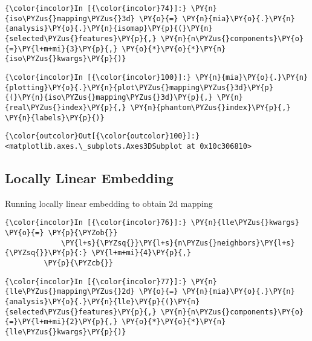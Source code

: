     \begin{Verbatim}[commandchars=\\\{\}]
{\color{incolor}In [{\color{incolor}74}]:} \PY{n}{iso\PYZus{}mapping\PYZus{}3d} \PY{o}{=} \PY{n}{mia}\PY{o}{.}\PY{n}{analysis}\PY{o}{.}\PY{n}{isomap}\PY{p}{(}\PY{n}{selected\PYZus{}features}\PY{p}{,} \PY{n}{n\PYZus{}components}\PY{o}{=}\PY{l+m+mi}{3}\PY{p}{,} \PY{o}{*}\PY{o}{*}\PY{n}{iso\PYZus{}kwargs}\PY{p}{)}
\end{Verbatim}

    \begin{Verbatim}[commandchars=\\\{\}]
{\color{incolor}In [{\color{incolor}100}]:} \PY{n}{mia}\PY{o}{.}\PY{n}{plotting}\PY{o}{.}\PY{n}{plot\PYZus{}mapping\PYZus{}3d}\PY{p}{(}\PY{n}{iso\PYZus{}mapping\PYZus{}3d}\PY{p}{,} \PY{n}{real\PYZus{}index}\PY{p}{,} \PY{n}{phantom\PYZus{}index}\PY{p}{,} \PY{n}{labels}\PY{p}{)}
\end{Verbatim}

            \begin{Verbatim}[commandchars=\\\{\}]
{\color{outcolor}Out[{\color{outcolor}100}]:} <matplotlib.axes.\_subplots.Axes3DSubplot at 0x10c306810>
\end{Verbatim}

    \subsection{Locally Linear Embedding}\label{locally-linear-embedding}

Running locally linear embedding to obtain 2d mapping

    \begin{Verbatim}[commandchars=\\\{\}]
{\color{incolor}In [{\color{incolor}76}]:} \PY{n}{lle\PYZus{}kwargs} \PY{o}{=} \PY{p}{\PYZob{}}
             \PY{l+s}{\PYZsq{}}\PY{l+s}{n\PYZus{}neighbors}\PY{l+s}{\PYZsq{}}\PY{p}{:} \PY{l+m+mi}{4}\PY{p}{,}
         \PY{p}{\PYZcb{}}
\end{Verbatim}

    \begin{Verbatim}[commandchars=\\\{\}]
{\color{incolor}In [{\color{incolor}77}]:} \PY{n}{lle\PYZus{}mapping\PYZus{}2d} \PY{o}{=} \PY{n}{mia}\PY{o}{.}\PY{n}{analysis}\PY{o}{.}\PY{n}{lle}\PY{p}{(}\PY{n}{selected\PYZus{}features}\PY{p}{,} \PY{n}{n\PYZus{}components}\PY{o}{=}\PY{l+m+mi}{2}\PY{p}{,} \PY{o}{*}\PY{o}{*}\PY{n}{lle\PYZus{}kwargs}\PY{p}{)}
\end{Verbatim}

